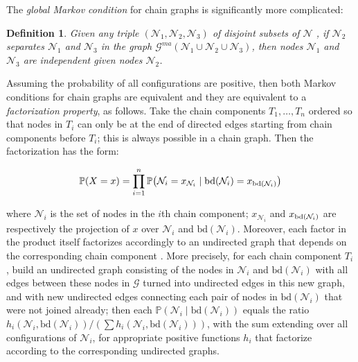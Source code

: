 \documentclass{article}
\newtheorem{definition}{Definition}
\newcommand{\pr}[1]{\mathbb{P}\!\left( #1 \right)}
\begin{document}
The \emph{global Markov condition} for chain graphs is significantly more complicated:

\begin{definition}
    Given any triple $(\mathcal{N}_1, \mathcal{N}_2, \mathcal{N}_3)$ of disjoint subsets of $\mathcal{N}$ , if $\mathcal{N}_2$ separates $\mathcal{N}_1$ and $\mathcal{N}_3$ in the graph $\mathcal{G}^{ma}(\mathcal{N}_1 \cup \mathcal{N}_2 \cup \mathcal{N}_3)$, then nodes $\mathcal{N}_1$ and $\mathcal{N}_3$ are independent given nodes $\mathcal{N}_2$.
\end{definition}


Assuming the probability of all configurations are positive, then both Markov conditions for chain graphs are equivalent and they are equivalent to a {\em factorization property}, as follows. Take the chain components $T_1, \dots, T_n$ ordered so that nodes in $T_i$ can only be at the end of directed edges starting from chain components before $T_i$; this is always possible in a chain graph. Then the factorization has the form:

\[
\pr{X=x} = \prod_{i=1}^n \pr{\mathcal{N}_i=x_{\mathcal{N}_i}\mid\mbox{bd}(\mathcal{N}_i)=x_{\mbox{\scriptsize bd}(\mathcal{N}_i)} }
\]

\noindent where $\mathcal{N}_i$ is the set of nodes in the $i$th chain component; $x_{\mathcal{N}_i}$ and $x_{\mbox{\scriptsize bd}(\mathcal{N}_i)}$ are respectively the projection of $x$ over $\mathcal{N}_i$ and $\mbox{bd}(\mathcal{N}_i)$. Moreover, each factor in the product itself factorizes accordingly to an undirected graph that depends on the corresponding chain component \cite{cowell99}. More precisely, for each chain component $T_i$, build an undirected graph consisting of the nodes in $\mathcal{N}_i$ and $\mbox{bd}(\mathcal{N}_i)$ with all edges between these nodes in $\mathcal{G}$ turned into undirected edges in this new graph, and with new undirected edges connecting each pair of nodes in  $\mbox{bd}(\mathcal{N}_i)$ that were not joined already; then each $\pr{\mathcal{N}_i\mid\mbox{bd}(\mathcal{N}_i)}$ equals the ratio $h_i(\mathcal{N}_i,\mbox{bd}(\mathcal{N}_i))/   (\sum h_i(\mathcal{N}_i,\mbox{bd}(\mathcal{N}_i)))$,
with the sum extending over all configurations of $\mathcal{N}_i$, for appropriate positive functions $h_i$ that factorize according to the corresponding undirected graphs. 
\end{document}
